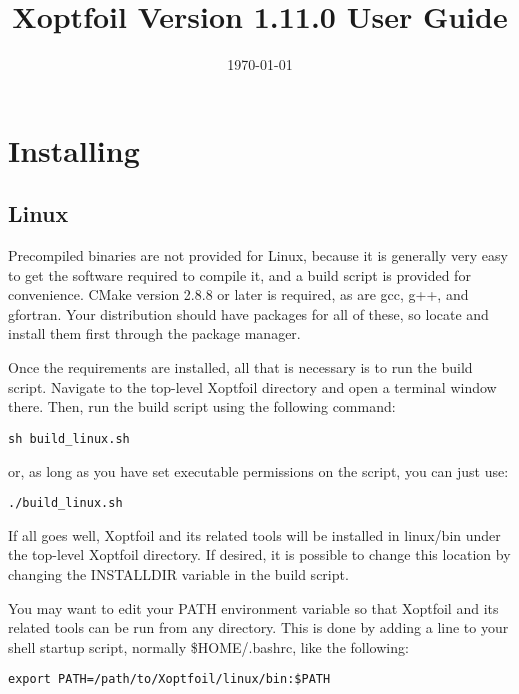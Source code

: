 \documentclass[11pt]{article}
\begin{document}
\title{Xoptfoil Version 1.11.0 User Guide}
\date{\today}
\maketitle

\tableofcontents

\section{Installing}\label{sec:installing}

\subsection{Linux}\label{sec:build_linux}

Precompiled binaries are not provided for Linux, because it is
generally very easy to get the software required to compile it, and a build script is
provided for convenience. CMake version 2.8.8 or later is required, as are gcc, g++, and
gfortran. Your distribution should have packages for all of these, so locate and install
them first through the package manager.

Once the requirements are installed, all that is necessary is to run the build script.
Navigate to the top-level Xoptfoil directory and open a terminal window there. Then, run
the build script using the following command:

\begin{verbatim}
sh build_linux.sh
\end{verbatim}

\noindent or, as long as you have set executable permissions on the script, you can just
use:

\begin{verbatim}
./build_linux.sh
\end{verbatim}

If all goes well, Xoptfoil and its related tools will be installed in linux/bin under the
top-level Xoptfoil directory. If desired, it is possible to change this location by
changing the INSTALLDIR variable in the build script.

You may want to edit your PATH environment variable so that Xoptfoil and its related tools
can be run from any directory. This is done by adding a line to your shell startup script,
normally \$HOME/.bashrc, like the following:

\begin{verbatim}
export PATH=/path/to/Xoptfoil/linux/bin:$PATH
\end{verbatim}
\end{document}
